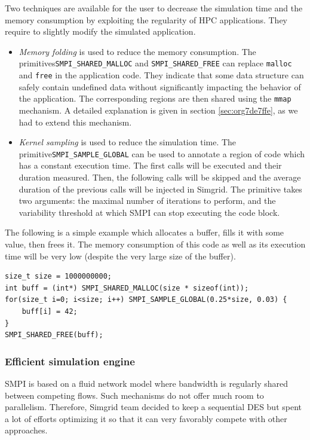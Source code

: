 \documentclass[12pt, a4paper]{memoir}
\begin{document}
Two techniques are available for the user to decrease the simulation time and the memory consumption by exploiting
the regularity of HPC applications. They require to slightly modify the simulated application.
\begin{itemize}
\item \emph{Memory folding} is used to reduce the memory consumption. The primitives\linebreak \texttt{SMPI\_SHARED\_MALLOC} and \texttt{SMPI\_SHARED\_FREE}
can replace \texttt{malloc} and \texttt{free} in the application code.  They indicate that some data structure can safely contain
undefined data without significantly impacting the behavior of the application. The corresponding regions are
then shared using the \texttt{mmap} mechanism. A detailed explanation is given in section \ref{sec:org7de7ffe}, as we had
to extend this mechanism.
\item \emph{Kernel sampling} is used to reduce the simulation time. The primitive\linebreak \texttt{SMPI\_SAMPLE\_GLOBAL} can be used to annotate
a region of code which has a constant execution time. The first calls will be executed and their duration
measured. Then, the following calls will be skipped and the average duration of the previous calls will be
injected in Simgrid. The primitive takes two arguments: the maximal number of iterations to perform, and the
variability threshold at which SMPI can stop executing the code block.
\end{itemize}
The following is a simple example which allocates a buffer, fills it with some value, then frees it. The memory
consumption of this code as well as its execution time will be very low (despite the very large size of the
buffer).

\begin{verbatim}
size_t size = 1000000000;
int buff = (int*) SMPI_SHARED_MALLOC(size * sizeof(int));
for(size_t i=0; i<size; i++) SMPI_SAMPLE_GLOBAL(0.25*size, 0.03) {
    buff[i] = 42;
}
SMPI_SHARED_FREE(buff);
\end{verbatim}

\subsubsection{Efficient simulation engine}
\label{sec:org567945a}
SMPI is based on a fluid network model where bandwidth is regularly shared between competing flows. Such mechanisms
do not offer much room to parallelism. Therefore, Simgrid team decided to keep a sequential DES but spent a lot of
efforts optimizing it so that it can very favorably compete with other approaches.
\end{document}
